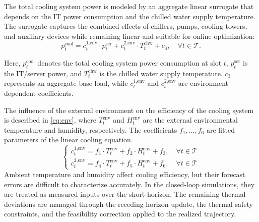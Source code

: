 \documentclass[a4paper,fleqn]{cas-dc}
\theoremstyle{plain}
\theoremstyle{remark}
\theoremstyle{plain}
\begin{document}
The total cooling system power is modeled by an aggregate linear surrogate that depends on the IT power consumption and the chilled water supply temperature. The surrogate captures the combined effects of chillers, pumps, cooling towers, and auxiliary devices while remaining linear and suitable for online optimization:
\begin{equation}\label{eq:Cooling}
p_t^{\text{cool}}
=c_t^{\text{1,env}} \cdot p_t^{\text{ser}}
+c_t^{\text{2,env}} \cdot T_t^{\text{chw}}
+c_{\text{3}}, \quad \forall t\in\mathcal{T}.
\end{equation}

Here, $p_t^{\text{cool}}$ denotes the total cooling system power consumption at slot $t$,
$p_t^{\text{ser}}$ is the IT/server power, and $T_t^{\text{chw}}$ is the chilled water supply temperature.
$c_{\text{3}}$ represents an aggregate base load, while $c_t^{\text{1,env}}$ and $c_t^{\text{2,env}}$
are environment-dependent coefficients. 

The influence of the external environment on the efficiency of the cooling system is described in \eqref{eq:env},
where $T_t^{\text{env}}$ and $H_t^{\text{env}}$ are the external environmental temperature and humidity, respectively. The coefficients $f_1,\ldots,f_6$ are fitted parameters of the linear cooling equation.
\begin{equation}\label{eq:env}
\left\{\begin{array}{l}
c_t^{\text{1,env}}=f_1 \cdot T_t^{\text{env}}+f_2 \cdot H_t^{\text{env}}+f_3, \quad \forall t\in\mathcal{T} \\
c_t^{\text{2,env}}=f_4 \cdot T_t^{\text{env}}+f_5 \cdot H_t^{\text{env}}+f_6, \quad \forall t\in\mathcal{T}
\end{array}\right.
\end{equation}
Ambient temperature and humidity affect cooling efficiency, but their forecast errors are difficult to characterize accurately. In the closed-loop simulations, they are treated as measured inputs over the short horizon. The remaining thermal deviations are managed through the receding horizon update, the thermal safety constraints, and the feasibility correction applied to the realized trajectory.
\end{document}
